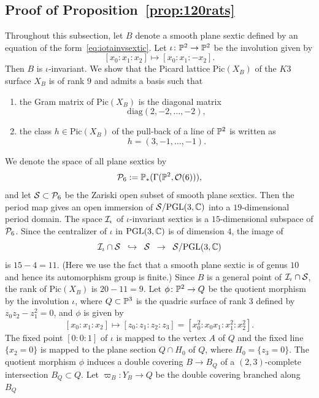 \documentclass{amsart} %
\newcommand{\diag}{\mathrm{diag}}
\newcommand{\ps}{B}
\newcommand{\Xps}{X_{\ps}}
\newcommand{\Pic}{\mathrm{Pic}}
\begin{document}
\subsection{Proof of Proposition~\ref{prop:120rats}}\label{subsec:120rats}
%
Throughout this subsection, 
let  $\ps$ denote a smooth plane sextic 
defined by an equation of the form~\eqref{eq:iotainvsextic}.
Let $\iota\colon \mathord{\mathbb{P}}^2\to \mathord{\mathbb{P}}^2$ be the involution given by
\[
[x_0: x_1: x_2]\mapsto [x_0: x_1: -x_2].
\]
Then $\ps$ is $\iota$-invariant.
We show that the Picard lattice $\Pic(\Xps)$ of 
the $K3$ surface $\Xps$ 
is of rank $9$ and 
admits a basis  such that 
%
\begin{enumerate}[label=(\alph*)]
\item 
the  Gram matrix of $\Pic(\Xps)$ 
is the diagonal matrix 
\[
\diag(2, -2, \dots, -2),
\]
\item  the class  $h\in  \Pic(\Xps)$ of the pull-back of a line of $\mathord{\mathbb{P}}^2$ is written as 
\[
h=(3, -1, \dots, -1).
\]
\end{enumerate}
%
We denote the space of all plane sextics by 
\[
\mathord{\mathcal{P}}_6:=\mathord{\mathbb{P}}_*(\Gamma(\mathord{\mathbb{P}}^2, \mathord{\mathcal{O}}(6))),
\]
and let $\mathord{\mathcal{S}}\subset \mathord{\mathcal{P}}_6$  be the Zariski open subset 
of smooth plane sextics.
Then the period map gives 
an open immersion of $\mathord{\mathcal{S}}/ \mathord{\mathrm{PGL}}(3, \mathord{\mathbb{C}})$
into a  $19$-dimensional period domain.
The  space $\mathord{\mathcal{I}}_{\iota}$ of $\iota$-invariant sextics is a $15$-dimensional
subspace of   $\mathord{\mathcal{P}}_6$.
Since 
the centralizer of $\iota$ in $\mathord{\mathrm{PGL}}(3, \mathord{\mathbb{C}})$ is of dimension $4$,
the image 
of 
\[
\mathord{\mathcal{I}}_{\iota}\cap \mathord{\mathcal{S}} \;\;\hookrightarrow\;\; \mathord{\mathcal{S}} \;\;\to\;\; \mathord{\mathcal{S}}/ \mathord{\mathrm{PGL}}(3, \mathord{\mathbb{C}})
\]
is  $15-4=11$.
(Here we use the  fact that a smooth plane sextic
is of genus $10$ and 
hence its automorphism group is finite.)
Since  $\ps$ is a general point of $\mathord{\mathcal{I}}_{\iota}\cap \mathord{\mathcal{S}}$,
the rank of $\Pic(\Xps)$ is $20-11=9$.
Let $\phi\colon \mathord{\mathbb{P}}^2\to Q$ be the quotient morphism by the involution $\iota$,
where $Q\subset \mathord{\mathbb{P}}^3$ is the quadric surface of rank $3$ defined by
$z_0z_2-z_1^2=0$,
and $\phi$ is given by 
\[
[x_0: x_1: x_2]\mapsto [z_0: z_1: z_2: z_3]=[x_0^2: x_0x_1: x_1^2: x_2^2].
\]
The fixed point $[0:0:1]$ of $\iota$ is mapped to the vertex $A$ of $Q$
and the fixed line $\{x_2=0\}$ is mapped to the plane section $Q\cap H_0$ 
of $Q$, where $H_0=\{z_3=0\}$.
The quotient morphism $\phi$ induces a double covering $\ps\to \ps_Q$
of a $(2, 3)$-complete intersection $\ps_Q\subset Q$.
Let $\varpi_{\ps}\colon Y_{\ps}\to Q$ be the double covering branched along $\ps_Q$
\end{document}
